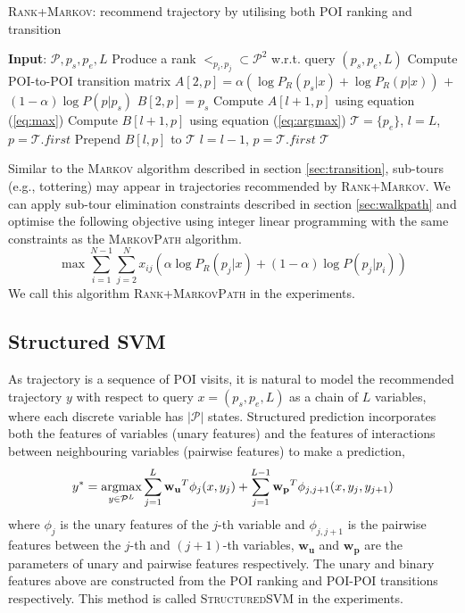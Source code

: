 \begin{algorithm}[t]
\caption{\textsc{Rank+Markov}: recommend trajectory by utilising both POI ranking and transition}
\label{alg:rank+markov}
\begin{algorithmic}[1]
\STATE \textbf{Input}: $\mathcal{P}, p_s, p_e, L$
\STATE Produce a rank $<_{p_i, p_j} \subset \mathcal{P}^2$ w.r.t. query $(p_s, p_e, L)$
\STATE Compute POI-to-POI transition matrix
    \STATE $A[2, p] = \alpha ( \log P_R(p_s|x) + \log P_R(p|x) )$ $+$ \\ \hfill $(1-\alpha) \log P(p|p_s)$
    \STATE $B[2, p] = p_s$
\ENDFOR
{}
        \STATE Compute $A[l+1, p]$ using equation (\ref{eq:max})
        \STATE Compute $B[l+1, p]$ using equation (\ref{eq:argmax})
    \ENDFOR
\ENDFOR
\STATE $\mathcal{T}= \{p_e\}$, $l = L$, $p = \mathcal{T}.first$
\REPEAT
    \STATE Prepend $B[l, p]$ to $\mathcal{T}$
    \STATE $l = l - 1$, $p = \mathcal{T}.first$
\RETURN $\mathcal{T}$
\end{algorithmic}
\end{algorithm}

Similar to the \textsc{Markov} algorithm described in section \ref{sec:transition},
sub-tours (e.g., tottering) may appear in trajectories recommended by \textsc{Rank+Markov}.
We can apply sub-tour elimination constraints described in section \ref{sec:walkpath} and
optimise the following objective using integer linear programming
with the same constraints as the \textsc{MarkovPath} algorithm.
\begin{displaymath}
    \max  \sum_{i=1}^{N-1} \sum_{j=2}^N x_{ij} (\alpha \log P_R(p_j | x) + (1-\alpha) \log P(p_j | p_i))
\end{displaymath}
We call this algorithm \textsc{Rank+MarkovPath} in the experiments.

\subsection{Structured SVM}
\label{sec:ssvm}

As trajectory is a sequence of POI visits,
it is natural to model the recommended trajectory $y$ with respect to query $x = (p_s, p_e, L)$
as a chain of $L$ variables, where each discrete variable has $|\mathcal{P}|$ states.
Structured prediction incorporates both the features of variables (unary features) and
the features of interactions between neighbouring variables (pairwise features) to make a
prediction,
\begin{displaymath}
    y^* = \operatorname*{argmax}_{y \in \mathcal{P}^L} \sum_{j=1}^L \mathbf{w_u}^T \phi_j(x, y_j) +
                                        \sum_{j=1}^{L-1} \mathbf{w_p}^T \phi_{j, j+1}(x, y_j, y_{j+1})
\end{displaymath}
where $\phi_j$ is the unary features of the $j$-th variable and $\phi_{j, j+1}$ is the pairwise features between
the $j$-th and $(j+1)$-th variables, $\mathbf{w_u}$ and $\mathbf{w_p}$ are the
parameters of unary and pairwise features respectively.
The unary and binary features above are constructed from the POI ranking and POI-POI transitions
respectively.
This method is called \textsc{StructuredSVM} in the experiments.

